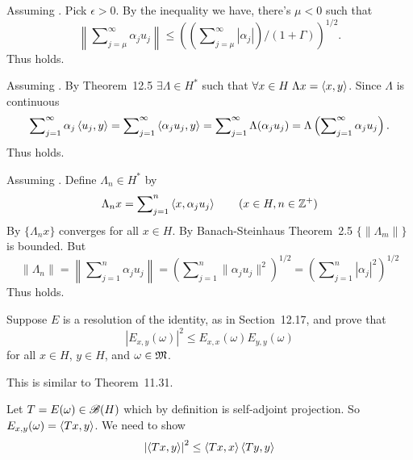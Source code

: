 \begin{enumerate}
Assuming .
Pick \(\epsilon > 0\). By the inequality we have, there's \(\mu < 0\) such that
\begin{equation*}
\left\| \sum\nolimits_{j=\mu}^\infty \alpha_j u_j\right\| \leq
 \left(\left(\sum\nolimits_{j=\mu}^\infty |\alpha_j|\right) /
   (1 + \Gamma)\right)^{1/2}.
\end{equation*}
Thus  holds.

Assuming . By Theorem~12.5
\(\exists \Lambda\in H^*\) such that
\(\forall x\in H\; \Lambda x = \left\langle x, y \right\rangle\).
Since \(\Lambda\) is continuous
\begin{equation*}
\sum\nolimits_{j=1}^\infty \alpha_j \left\langle u_j,y \right\rangle =
\sum\nolimits_{j=1}^\infty \left\langle \alpha_j u_j,y \right\rangle =
\sum\nolimits_{j=1}^\infty \Lambda(\alpha_j u_j) =
\Lambda\left(\sum\nolimits_{j=1}^\infty \alpha_j u_j\right).
\end{equation*}
Thus  holds.

Assuming .
Define \(\Lambda_n \in H^*\) by
\begin{equation*}
\Lambda_n x = \sum\nolimits_{j=1}^n \left\langle x, \alpha_j u_j \right\rangle
\qquad (x\in H, n\in \mathbb{Z}^+)
\end{equation*}
By  \(\{\Lambda_n x\}\) converges for all \(x\in H\).
By Banach-Steinhaus Theorem~2.5 \(\{\|\Lambda_m\|\}\) is bounded.
But
\begin{equation*}
\|\Lambda_n\|
 = \left\|\sum\nolimits_{j=1}^n \alpha_j u_j\right\|
 = \left(\sum\nolimits_{j=1}^n \|\alpha_j u_j\|^2\right)^{1/2}
 = \left(\sum\nolimits_{j=1}^n |\alpha_j|^2\right)^{1/2}
\end{equation*}
Thus  holds.

\begin{excopy}
Suppose $E$ is a resolution of the identity, as in Section~12.17, and prove that
\begin{equation*}
\left|E_{x,y}(\omega)\right|^2 \leq E_{x,x}(\omega) E_{y,y}(\omega)
\end{equation*}
for all \(x\in H\), \(y\in H\), and \(\omega \in \mathfrak{M}\).
\end{excopy}

This is similar to Theorem~11.31.

Let \(T=E(\omega)\in\mathscr{B}(H)\) which by definition is self-adjoint projection.
So \(E_{x,y}(\omega) = \left\langle Tx,y \right\rangle\).
We need to show
\begin{equation} \label{eq:12.6:goal}
\left|\left\langle Tx,y \right\rangle\right|^2
 \leq
 \left\langle Tx,x \right\rangle\left\langle Ty,y \right\rangle
\end{equation}


\end{enumerate}
